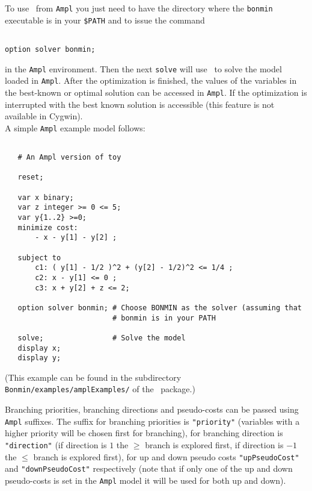 To use \Bonmin\ from {\tt Ampl} you just need to have the directory where the
{\tt bonmin} executable is in your {\tt \$PATH} and to issue the
command

\begin{colorverb}
\begin{verbatim}

option solver bonmin;

\end{verbatim}
\end{colorverb}

in the {\tt Ampl} environment. Then the next {\tt solve} will
use \Bonmin\ to solve the model loaded in {\tt Ampl}.
After the optimization is finished, the values of the variables in the best-known
or optimal solution can be accessed in {\tt Ampl}. If the optimization is interrupted
with {\tt <CTRL-C>} the best known solution is accessible (this feature is not available in Cygwin).\\

A simple {\tt Ampl} example model follows:

\begin{colorverb}
\begin{verbatim}

   # An Ampl version of toy

   reset;

   var x binary;
   var z integer >= 0 <= 5;
   var y{1..2} >=0;
   minimize cost:
       - x - y[1] - y[2] ;

   subject to
       c1: ( y[1] - 1/2 )^2 + (y[2] - 1/2)^2 <= 1/4 ;
       c2: x - y[1] <= 0 ;
       c3: x + y[2] + z <= 2;

   option solver bonmin; # Choose BONMIN as the solver (assuming that
                         # bonmin is in your PATH

   solve;                # Solve the model
   display x;
   display y;

\end{verbatim}
\end{colorverb}

(This example can be found in the subdirectory {\tt Bonmin/examples/amplExamples/} of
the \Bonmin\ package.)

Branching priorities, branching directions and pseudo-costs can be passed using {\tt Ampl} suffixes.
The suffix for branching priorities is {\tt "priority"} (variables with a higher priority
will be chosen first for branching),
for branching direction is {\tt "direction"} (if direction is $1$ the $\geq$ branch
is explored first, if direction is $-1$ the $\leq$ branch is explored first), for up
and down pseudo costs {\tt "upPseudoCost"} and {\tt "downPseudoCost"} respectively
(note that if only one of the up and down pseudo-costs is set in the {\tt Ampl} model it will
be used for both up and down).\\

